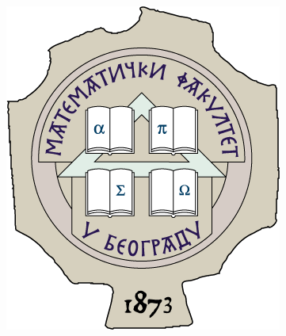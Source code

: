 \documentclass{article}
\begin{document}
\begin{center}
\begin{minipage}{.16\linewidth}
    \includegraphics[width=.7\linewidth]{media/images/grb.png}
    ~\vfill
    ~\vfill
  \end{minipage}
\end{center}

\vspace{2cm}
\end{document}
